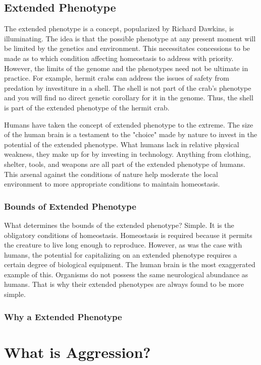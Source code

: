 \documentclass[12pt]{article}
\begin{document}
\subsection{Extended Phenotype}
The extended phenotype is a concept, popularized by Richard Dawkins, is illuminating.
The idea is that the possible phenotype at any present moment will be limited by the genetics and environment.
This necessitates concessions to be made as to which condition affecting homeostasis to address with priority.
However, the limits of the genome and the phenotypes need not be ultimate in practice.
For example, hermit crabs can address the issues of safety from predation by investiture in a shell.
The shell is not part of the crab's phenotype and you will find no direct genetic corollary for it in the genome.
Thus, the shell is part of the extended phenotype of the hermit crab.

Humans have taken the concept of extended phenotype to the extreme.
The size of the human brain is a testament to the "choice" made by nature to invest in the potential of the extended phenotype.
What humans lack in relative physical weakness, they make up for by investing in technology.
Anything from clothing, shelter, tools, and weapons are all part of the extended phenotype of humans.
This arsenal against the conditions of nature help moderate the local environment to more appropriate conditions to maintain homeostasis.

\subsubsection{Bounds of Extended Phenotype}
What determines the bounds of the extended phenotype?
Simple.
It is the obligatory conditions of homeostasis.
Homeostasis is required because it permits the creature to live long enough to reproduce.
However, as was the case with humans, the potential for capitalizing on an extended phenotype requires a certain degree of biological equipment.
The human brain is the most exaggerated example of this.
Organisms do not possess the same neurological abundance as humans.
That is why their extended phenotypes are always found to be more simple.



\subsubsection{Why a Extended Phenotype}
\section{What is Aggression?}
\end{document}
